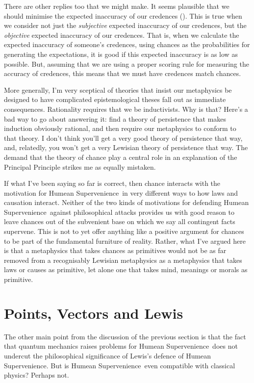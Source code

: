 \documentclass[
  10pt,
  letterpaper,
  DIV=11,
  numbers=noendperiod,
  twoside]{scrartcl}
\begin{document}
There are other replies too that we might make. It seems plausible that
we should minimise the expected inaccuracy of our credences
(). This is true when we consider
not just the \emph{subjective} expected inaccuracy of our credences, but
the \emph{objective} expected inaccuracy of our credences. That is, when
we calculate the expected inaccuracy of someone's credences, using
chances as the probabilities for generating the expectations, it is good
if this expected inaccuracy is as low as possible. But, assuming that we
are using a proper scoring rule for measuring the accuracy of credences,
this means that we must have credences match chances.

More generally, I'm very sceptical of theories that insist our
metaphysics be designed to have complicated epistemological theses fall
out as immediate consequences. Rationality requires that we be
inductivists. Why is that? Here's a bad way to go about answering it:
find a theory of persistence that makes induction obviously rational,
and then require our metaphysics to conform to that theory. I don't
think you'll get a very good theory of persistence that way, and,
relatedly, you won't get a very Lewisian theory of persistence that way.
The demand that the theory of chance play a central role in an
explanation of the Principal Principle strikes me as equally mistaken.

If what I've been saying so far is correct, then chance interacts with
the motivation for Humean Supervenience~in very different ways to how
laws and causation interact. Neither of the two kinds of motivations for
defending Humean Supervenience~against philosophical attacks provides us
with good reason to leave chances out of the subvenient base on which we
say all contingent facts supervene. This is not to yet offer anything
like a positive argument for chances to be part of the fundamental
furniture of reality. Rather, what I've argued here is that a
metaphysics that takes chances as primitives would not be as far removed
from a recognisably Lewisian metaphysics as a metaphysics that takes
laws or causes as primitive, let alone one that takes mind, meanings or
morals as primitive.

\section{Points, Vectors and Lewis}\label{points-vectors-and-lewis}

The other main point from the discussion of the previous section is that
the fact that quantum mechanics raises problems for Humean
Supervenience~does not undercut the philosophical significance of
Lewis's defence of Humean Supervenience. But is Humean
Supervenience~even compatible with classical physics? Perhaps not.
\end{document}
